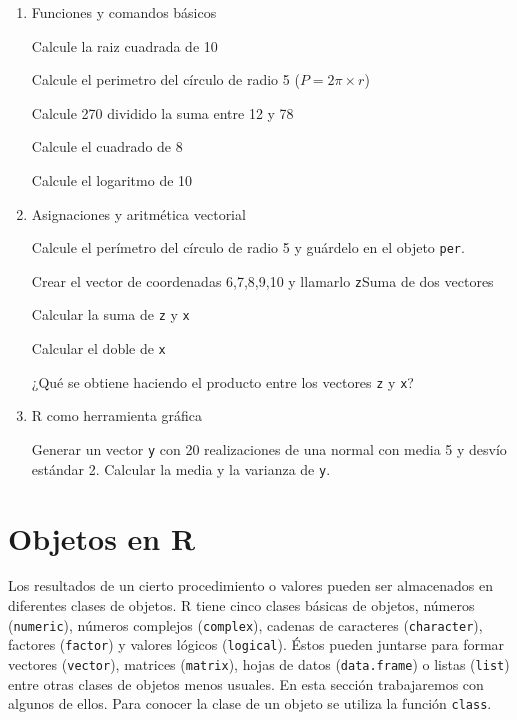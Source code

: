 \documentclass[]{book}
\begin{document}
\begin{boxeda}
\begin{enumerate}
\def\labelenumi{\arabic{enumi}.}
\item
  Funciones y comandos básicos

  Calcule la raiz cuadrada de 10

  Calcule el perimetro del círculo de radio 5 (\(P = 2\pi \times r\))

  Calcule 270 dividido la suma entre 12 y 78

  Calcule el cuadrado de 8

  Calcule el logaritmo de 10
\item
  Asignaciones y aritmética vectorial

  Calcule el perímetro del círculo de radio 5 y guárdelo en el objeto
  \texttt{per}.

  Crear el vector de coordenadas 6,7,8,9,10 y llamarlo \texttt{z}Suma de
  dos vectores

  Calcular la suma de \texttt{z} y \texttt{x}

  Calcular el doble de \texttt{x}

  ¿Qué se obtiene haciendo el producto entre los vectores \texttt{z} y
  \texttt{x}?
\item
  R como herramienta gráfica

  Generar un vector \texttt{y} con 20 realizaciones de una normal con
  media 5 y desvío estándar 2. Calcular la media y la varianza de
  \texttt{y}.
\end{enumerate}
\end{boxeda}

\chapter{Objetos en R}\label{objetos-en-r}

Los resultados de un cierto procedimiento o valores pueden ser
almacenados en diferentes clases de objetos. R tiene cinco clases
básicas de objetos, números (\texttt{numeric}), números complejos
(\texttt{complex}), cadenas de caracteres (\texttt{character}), factores
(\texttt{factor}) y valores lógicos (\texttt{logical}). Éstos pueden
juntarse para formar vectores (\texttt{vector}), matrices
(\texttt{matrix}), hojas de datos (\texttt{data.frame}) o listas
(\texttt{list}) entre otras clases de objetos menos usuales. En esta
sección trabajaremos con algunos de ellos. Para conocer la clase de un
objeto se utiliza la función \texttt{class}.
\end{document}
